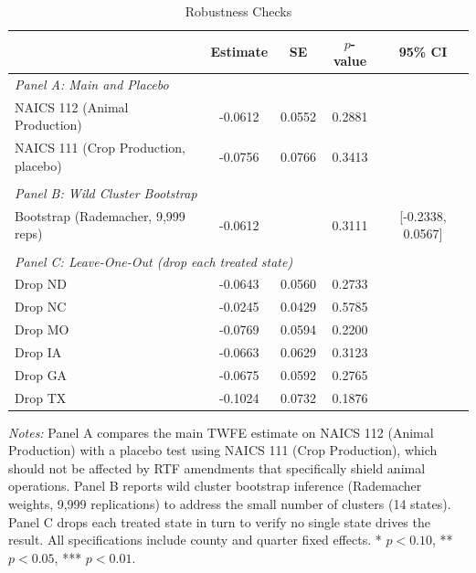 \begin{table}[H]
\centering
\caption{Robustness Checks}
\label{tab:robust}
\begin{threeparttable}
\begin{tabular}{lcccc}
\toprule
 & Estimate & SE & $p$-value & 95\% CI \\
\midrule
\multicolumn{5}{l}{\textit{Panel A: Main and Placebo}} \\
NAICS 112 (Animal Production) & -0.0612 & 0.0552 & 0.2881 & \\
NAICS 111 (Crop Production, placebo) & -0.0756 & 0.0766 & 0.3413 & \\
\\
\multicolumn{5}{l}{\textit{Panel B: Wild Cluster Bootstrap}} \\
Bootstrap (Rademacher, 9,999 reps) & -0.0612 & & 0.3111 & [-0.2338, 0.0567] \\
\\
\multicolumn{5}{l}{\textit{Panel C: Leave-One-Out (drop each treated state)}} \\
Drop ND & -0.0643 & 0.0560 & 0.2733 & \\
Drop NC & -0.0245 & 0.0429 & 0.5785 & \\
Drop MO & -0.0769 & 0.0594 & 0.2200 & \\
Drop IA & -0.0663 & 0.0629 & 0.3123 & \\
Drop GA & -0.0675 & 0.0592 & 0.2765 & \\
Drop TX & -0.1024 & 0.0732 & 0.1876 & \\
\bottomrule
\end{tabular}
\begin{tablenotes}[flushleft]
\small
\item \textit{Notes:} Panel A compares the main TWFE estimate on NAICS 112 (Animal Production) with a placebo test using NAICS 111 (Crop Production), which should not be affected by RTF amendments that specifically shield animal operations. Panel B reports wild cluster bootstrap inference (Rademacher weights, 9,999 replications) to address the small number of clusters (14 states). Panel C drops each treated state in turn to verify no single state drives the result. All specifications include county and quarter fixed effects. * $p<0.10$, ** $p<0.05$, *** $p<0.01$.
\end{tablenotes}
\end{threeparttable}
\end{table}
